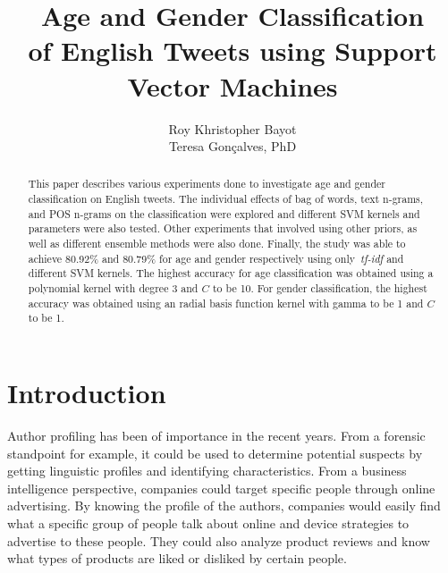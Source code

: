 \documentclass[a4paper]{llncs}
\begin{document}
\title{Age and Gender Classification\\
of English Tweets using Support Vector Machines}
\titlerunning{}
\author{Roy Khristopher Bayot\\Teresa Gonçalves, PhD}

\maketitle
\begin{abstract}
This paper describes various experiments done to investigate age and gender classification on English tweets. The individual effects of bag of words, text n-grams, and POS n-grams on the classification were explored and different SVM kernels and parameters were also tested. Other experiments that involved using other priors, as well as different ensemble methods were also done. Finally, the study was able to achieve 80.92\% and 80.79\% for age and gender respectively using only~\textit{tf-idf} and different SVM kernels. The highest accuracy for age classification was obtained using a polynomial kernel with degree 3 and $C$ to be 10. For gender classification, the highest accuracy was obtained using an radial basis function kernel with gamma to be 1 and $C$ to be 1. 
\end{abstract}

\section{Introduction}
Author profiling has been of importance in the recent years. From a forensic standpoint for example, it could be used to determine potential suspects by getting linguistic profiles and identifying characteristics. From a business intelligence perspective, companies could target specific people through online advertising. By knowing the profile of the authors, companies would easily find what a specific group of people talk about online and device strategies to advertise to these people. They could also analyze product reviews and know what types of products are liked or disliked by certain people. 
\end{document}
